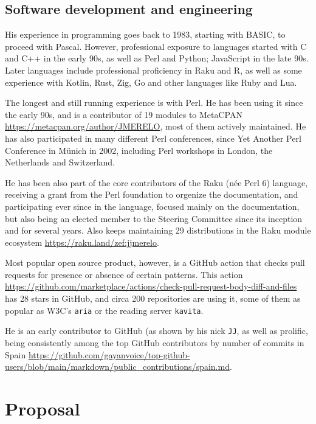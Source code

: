 \documentclass[a4paper]{article}
\begin{document}
\subsection{Software development and engineering}

His experience in programming goes back to 1983, starting with BASIC, to proceed
with Pascal. However, professional exposure to languages started with C and C++
in the early 90s, as well as Perl and Python; JavaScript in the late 90s. Later
languages include professional proficiency in Raku and R, as well as some
experience with Kotlin, Rust, Zig, Go and other languages like Ruby and Lua.

The longest and still running experience is with Perl. He has been using it
since the early 90s, and is a contributor of 19 modules to MetaCPAN
\url{https://metacpan.org/author/JMERELO}, most of them actively maintained. He
has also participated in many different Perl conferences, since Yet Another Perl
Conference in Münich in 2002, including Perl workshops in London, the
Netherlands and Switzerland.

He has been also part of the core contributors of the Raku (née Perl 6)
language, receiving a grant from the Perl foundation to orgenize the
documentation, and participating ever since in the language, focused mainly on
the documentation, but also being an elected member to the Steering Committee
since its inception and for several years. Also keeps maintaining 29
distributions in the Raku module ecosystem \url{https://raku.land/zef:jjmerelo}.

Most popular open source product, however, is a GitHub action that checks pull
requests for presence or absence of certain patterns. This action
\url{https://github.com/marketplace/actions/check-pull-request-body-diff-and-files}
has 28 stars in GitHub, and circa 200 repositories are using it, some of them as
popular as W3C's {\tt aria} or the reading server {\tt kavita}.

He is an early contributor to GitHub (as shown by his nick {\tt JJ}, as well as
prolific, being consistently among the top GitHub contributors by number of
commits in Spain
\url{https://github.com/gayanvoice/top-github-users/blob/main/markdown/public_contributions/spain.md}.



\section{Proposal}



\end{document}
